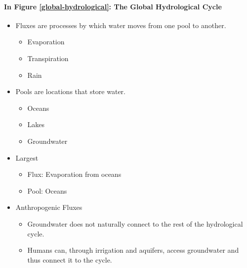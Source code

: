 \documentclass[12pt]{article}
\begin{document}
\paragraph{In Figure \ref{global-hydrological}: The Global Hydrological Cycle}
\begin{itemize}
    \item Fluxes are processes by which water moves from one pool to another.
          \begin{itemize}
              \item Evaporation
              \item Transpiration
              \item Rain
          \end{itemize}
    \item Pools are locations that store water.
          \begin{itemize}
              \item Oceans
              \item Lakes
              \item Groundwater
          \end{itemize}
    \item Largest
          \begin{itemize}
              \item Flux: Evaporation from oceans
              \item Pool: Oceans
          \end{itemize}
    \item Anthropogenic Fluxes
          \begin{itemize}
              \item Groundwater does not naturally connect to the rest of the hydrological cycle.
              \item Humans can, through irrigation and aquifers, access groundwater and thus connect it to the cycle.
          \end{itemize}
\end{itemize}
\end{document}
